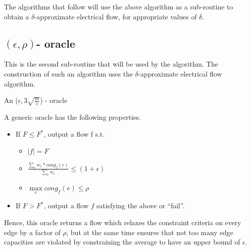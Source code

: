 \documentclass[BTech]{iitmdiss}
\begin{document}
	The algorithms that follow will use the above algorithm as a sub-routine to obtain a $\delta$-approximate electrical flow, for appropriate
	values of $\delta$.
	  
	  \subsection{$(\epsilon,\rho)$- oracle}
	    This is the second sub-routine that will be used by the algorithm. The construction of such an algorithm uses the $\delta$-approximate
	    electrical flow algorithm. \\
	    
	    \begin{algorithm}[H]
	     \caption{An ($\epsilon, 3 \sqrt{\frac{m}{\epsilon}}$) - oracle}
	    \end{algorithm}
   
	    A generic oracle has the following properties.
	    \begin{itemize}
	     \item 
	      If $F \leq F^{\ast}$, output a flow f s.t. \\
	      
		\begin{itemize}
		 \item 
		    $|f| = F$ \\
		 \item
		    $\frac{\sum\limits_{e} w_e \ast cong_f(e)}{\sum\limits_{e} w_e} \leq (1+\epsilon)$ \\
		 \item
		    $\max\limits_{e} cong_f(e) \leq \rho$ \\
		\end{itemize}

	     \item
		If $F > F^{\ast}$, output a flow $f$ satisfying the above or ``fail''.
	  \end{itemize}
	    Hence, this oracle returns a flow which relaxes the constraint criteria on every edge by a factor of $\rho$, but at the same time ensures
	    that not too many edge capacities are violated by constraining the average to have an upper bound of $\epsilon$.
	    
\end{document}
